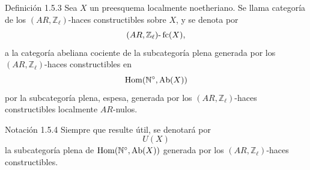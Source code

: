 \begin{statement}{Definición 1.5.3}
Sea \(X\) un preesquema localmente noetheriano. Se llama categoría de los \((AR,\mathbb Z_\ell)\)-haces constructibles sobre \(X\), y se denota por
\[
(AR,\mathbb Z_\ell)\text{-}\operatorname{fc}(X),
\]
a la categoría abeliana cociente de la subcategoría plena generada por los \((AR,\mathbb Z_\ell)\)-haces constructibles en
\[
\operatorname{Hom}(\mathbb N^\circ,\operatorname{Ab}(X))
\]
por la subcategoría plena, espesa, generada por los \((AR,\mathbb Z_\ell)\)-haces constructibles localmente \(AR\)-nulos.
\end{statement}

\begin{statement}{Notación 1.5.4}
Siempre que resulte útil, se denotará por
\[
U(X)
\]
la subcategoría plena de \(\operatorname{Hom}(\mathbb N^\circ,\operatorname{Ab}(X))\) generada por los \((AR,\mathbb Z_\ell)\)-haces constructibles.
\end{statement}
